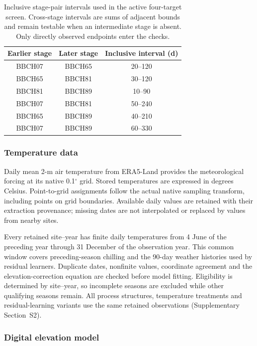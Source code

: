 \documentclass[a4paper,12pt]{article}
\let\OriginalSubsubsection\subsubsection
\renewcommand{\subsubsection}{\FloatBarrier\OriginalSubsubsection}
\begin{document}
\begin{table}[!htbp]
\centering
\caption{Inclusive stage-pair intervals used in the active four-target screen. Cross-stage intervals are sums of adjacent bounds and remain testable when an intermediate stage is absent. Only directly observed endpoints enter the checks.}
\label{tab:phase_intervals}
\small
\begin{tabular}{ccc}
\toprule
Earlier stage & Later stage & Inclusive interval (d) \\
\midrule
BBCH07 & BBCH65 & 20--120 \\
BBCH65 & BBCH81 & 30--120 \\
BBCH81 & BBCH89 & 10--90 \\
BBCH07 & BBCH81 & 50--240 \\
BBCH65 & BBCH89 & 40--210 \\
BBCH07 & BBCH89 & 60--330 \\
\bottomrule
\end{tabular}
\end{table}

\subsubsection{Temperature data}

Daily mean 2-m air temperature from ERA5-Land \citep{munozSabaterERA5Land2021,copernicusClimateChangeServiceERA5LandHourly2019} provides the meteorological forcing at its native 0.1$^{\circ}$ grid. Stored temperatures are expressed in degrees Celsius. Point-to-grid assignments follow the actual native sampling transform, including points on grid boundaries. Available daily values are retained with their extraction provenance; missing dates are not interpolated or replaced by values from nearby sites.

Every retained site--year has finite daily temperatures from 4 June of the preceding year through 31 December of the observation year. This common window covers preceding-season chilling and the 90-day weather histories used by residual learners. Duplicate dates, nonfinite values, coordinate agreement and the elevation-correction equation are checked before model fitting. Eligibility is determined by site--year, so incomplete seasons are excluded while other qualifying seasons remain. All process structures, temperature treatments and residual-learning variants use the same retained observations (Supplementary Section~S2).

\subsubsection{Digital elevation model}
\end{document}
